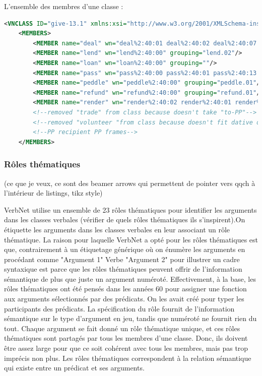 L'ensemble des membres d'une classe :
\begin{lstlisting}[language=XML, caption = les membres]
<VNCLASS ID="give-13.1" xmlns:xsi="http://www.w3.org/2001/XMLSchema-instance" xsi:noNamespaceSchemaLocation="vn_schema-3.xsd">
    <MEMBERS>
        <MEMBER name="deal" wn="deal%2:40:01 deal%2:40:02 deal%2:40:07 deal%2:40:06" grouping="deal.04"/>
        <MEMBER name="lend" wn="lend%2:40:00" grouping="lend.02"/>
        <MEMBER name="loan" wn="loan%2:40:00" grouping=""/>
        <MEMBER name="pass" wn="pass%2:40:00 pass%2:40:01 pass%2:40:13 pass%2:38:04" grouping="pass.04"/>
        <MEMBER name="peddle" wn="peddle%2:40:00" grouping="peddle.01"/>
        <MEMBER name="refund" wn="refund%2:40:00" grouping="refund.01"/>
        <MEMBER name="render" wn="render%2:40:02 render%2:40:01 render%2:40:00 render%2:40:03" grouping="render.02"/>
        <!--removed "trade" from class because doesn't take "to-PP"-->
        <!--removed "volunteer "from class because doesn't fit dative or-->
        <!--PP recipient PP frames-->
    </MEMBERS>
\end{lstlisting}

\subsubsection{Rôles thématiques}

(ce que je veux, ce sont des beamer arrows qui permettent de pointer vers qqch à l'intérieur de listings, tikz style)

VerbNet utilise un ensemble de 23 rôles thématiques pour identifier les arguments dans les classes verbales (vérifier de quels rôles thématiques ils s'inspirent).On étiquette les arguments dans les classes verbales en leur associant un rôle thématique. La raison pour laquelle VerbNet a opté pour les rôles thématiques est que, contrairement à un étiquetage générique où on énumère les arguments en procédant comme "Argument 1" Verbe "Argument 2" pour illustrer un cadre syntaxique est parce que les rôles thématiques peuvent offrir de l'information sémantique de plus que juste un argument numéroté. Effectivement, à la base, les rôles thématiques ont été pensés dans les années 60 pour assigner une fonction aux arguments sélectionnés par des prédicats. On les avait créé pour typer les participants des prédicats. La spécification du rôle fournit de l'information sémantique sur le type d'argument en jeu, tandis que numéroté ne fournit rien du tout. Chaque argument se fait donné un rôle thématique unique, et ces rôles thématiques sont partagés par tous les membres d'une classe. Donc, ils doivent être assez large pour que ce soit cohérent avec tous les membres, mais pas trop imprécis non plus. Les rôles thématiques correspondent à la relation sémantique qui existe entre un prédicat et ses arguments.

